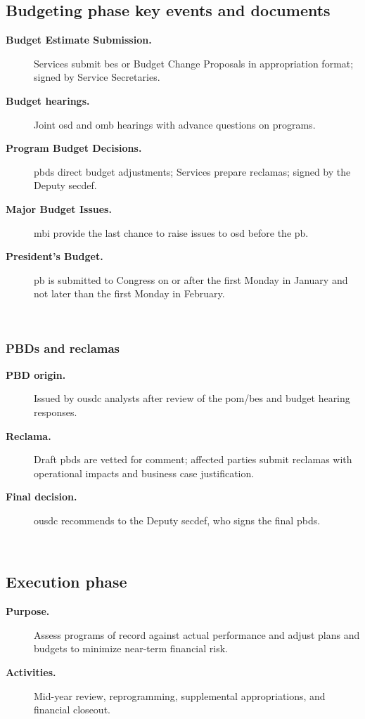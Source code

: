 \documentclass[../main.tex]{subfiles}
\begin{document}
\subsection{Budgeting phase key events and documents}
\begin{description}
  \item[\textbf{Budget Estimate Submission.}] Services submit \ac{bes} or Budget Change Proposals in appropriation format; signed by Service Secretaries.
  \item[\textbf{Budget hearings.}] Joint \ac{osd} and \ac{omb} hearings with advance questions on programs.
  \item[\textbf{Program Budget Decisions.}] \acp{pbd} direct budget adjustments; Services prepare reclamas; signed by the Deputy \ac{secdef}.
  \item[\textbf{Major Budget Issues.}] \ac{mbi} provide the last chance to raise issues to \ac{osd} before the \ac{pb}.
  \item[\textbf{President's Budget.}] \ac{pb} is submitted to Congress on or after the first Monday in January and not later than the first Monday in February.
\end{description}
~

\subsubsection{PBDs and reclamas}
\begin{description}
  \item[\textbf{PBD origin.}] Issued by \ac{ousdc} analysts after review of the \ac{pom}/\ac{bes} and budget hearing responses.
  \item[\textbf{Reclama.}] Draft \acp{pbd} are vetted for comment; affected parties submit reclamas with operational impacts and business case justification.
  \item[\textbf{Final decision.}] \ac{ousdc} recommends to the Deputy \ac{secdef}, who signs the final \acp{pbd}.
\end{description}
~

\subsection{Execution phase}
\begin{description}
  \item[\textbf{Purpose.}] Assess programs of record against actual performance and adjust plans and budgets to minimize near-term financial risk.
  \item[\textbf{Activities.}] Mid-year review, reprogramming, supplemental appropriations, and financial closeout.
\end{description}
~
\end{document}
